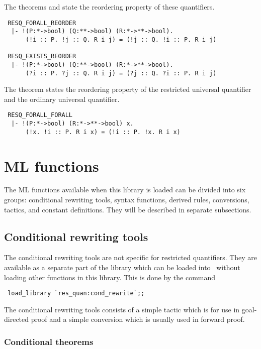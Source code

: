 The theorems  and 
state the reordering property of these quantifiers.
\begin{verbatim}
 RESQ_FORALL_REORDER
  |- !(P:*->bool) (Q:**->bool) (R:*->**->bool).
      (!i :: P. !j :: Q. R i j) = (!j :: Q. !i :: P. R i j)

 RESQ_EXISTS_REORDER
  |- !(P:*->bool) (Q:**->bool) (R:*->**->bool).
      (?i :: P. ?j :: Q. R i j) = (?j :: Q. ?i :: P. R i j)
\end{verbatim}
The theorem  states the reordering property of
the restricted universal quantifier and the ordinary universal
quantifier.
\begin{verbatim}
 RESQ_FORALL_FORALL
  |- !(P:*->bool) (R:*->**->bool) x.
      (!x. !i :: P. R i x) = (!i :: P. !x. R i x)
\end{verbatim}

\section{ML functions}

The ML functions available when this library is loaded can be divided
into six groups: conditional rewriting tools, syntax functions,
derived rules, conversions, tactics, and constant definitions. They
will be described in separate subsections. 

\subsection{Conditional rewriting tools}

The conditional rewriting tools are not specific for restricted
quantifiers. They are available as a separate part of the library
which can be loaded into \HOL\ without loading other functions in this
library. This is done by the command 
\begin{verbatim}
 load_library `res_quan:cond_rewrite`;;
\end{verbatim}

The conditional rewriting tools consists of a simple tactic which is
for use in goal-directed proof and a simple conversion which is
usually used in forward proof.

\subsubsection{Conditional theorems}

